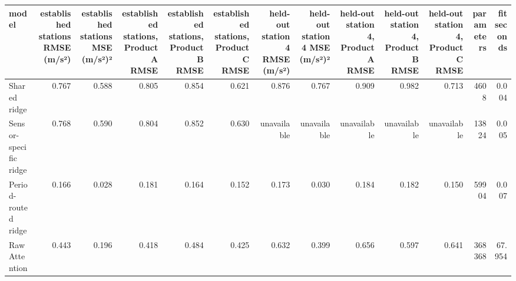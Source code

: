 \begin{tabular}{lrrrrrrrrrrrr}
\toprule
model & established stations RMSE (m/s²) & established stations MSE (m/s²)² & established stations, Product A RMSE & established stations, Product B RMSE & established stations, Product C RMSE & held-out station 4 RMSE (m/s²) & held-out station 4 MSE (m/s²)² & held-out station 4, Product A RMSE & held-out station 4, Product B RMSE & held-out station 4, Product C RMSE & parameters & fit seconds \\
\midrule
Shared ridge & 0.767 & 0.588 & 0.805 & 0.854 & 0.621 & 0.876 & 0.767 & 0.909 & 0.982 & 0.713 & 4608 & 0.004 \\
Sensor-specific ridge & 0.768 & 0.590 & 0.804 & 0.852 & 0.630 & unavailable & unavailable & unavailable & unavailable & unavailable & 13824 & 0.005 \\
Period-routed ridge & 0.166 & 0.028 & 0.181 & 0.164 & 0.152 & 0.173 & 0.030 & 0.184 & 0.182 & 0.150 & 59904 & 0.007 \\
Raw Attention & 0.443 & 0.196 & 0.418 & 0.484 & 0.425 & 0.632 & 0.399 & 0.656 & 0.597 & 0.641 & 368368 & 67.954 \\
\bottomrule
\end{tabular}
